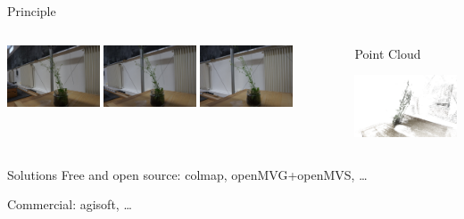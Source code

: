 \documentclass[aspectratio=169]{beamer}
\begin{document}
\begin{frame}{Principle}
\begin{columns}
\begin{column}{0.45\textwidth}
            \includegraphics[width=0.3\textwidth]{images/rgb006.jpg}
            \includegraphics[width=0.3\textwidth]{images/rgb007.jpg}
            \includegraphics[width=0.3\textwidth]{images/rgb008.jpg}
        \end{column}
        \begin{column}{0.1\textwidth}
            $\Rightarrow$
        \end{column}
        \begin{column}{0.45\textwidth}
            \centering
            Point Cloud

            \includegraphics[width=\textwidth]{images/pointcloud.png}
        \end{column}
    \end{columns}
    \vspace{2em}
    \begin{block}{Solutions}
        Free and open source: colmap, openMVG+openMVS, \dots

        Commercial: agisoft, \dots

    \end{block}
\end{frame}
\end{document}
